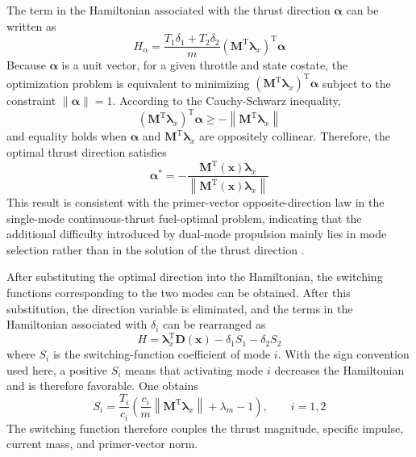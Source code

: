 ﻿\documentclass{IEEEtaes}
\begin{document}
The term in the Hamiltonian associated with the thrust direction $\bm{\alpha}$ can be written as
\begin{equation}
H_{\alpha}=\frac{T_1\delta_1+T_2\delta_2}{m}\left(\bm{M}^{\mathrm{T}}\bm{\lambda}_x\right)^{\mathrm{T}}\bm{\alpha}
\end{equation}
Because $\bm{\alpha}$ is a unit vector, for a given throttle and state costate, the optimization problem is equivalent to minimizing $\left(\bm{M}^{\mathrm{T}}\bm{\lambda}_x\right)^{\mathrm{T}}\bm{\alpha}$ subject to the constraint $\|\bm{\alpha}\|=1$. According to the Cauchy-Schwarz inequality,
\begin{equation}
\left(\bm{M}^{\mathrm{T}}\bm{\lambda}_x\right)^{\mathrm{T}}\bm{\alpha}\geq-\left\|\bm{M}^{\mathrm{T}}\bm{\lambda}_x\right\|
\end{equation}
and equality holds when $\bm{\alpha}$ and $\bm{M}^{\mathrm{T}}\bm{\lambda}_x$ are oppositely collinear. Therefore, the optimal thrust direction satisfies
\begin{equation}
\bm{\alpha}^{*}=-\frac{\bm{M}^{\mathrm{T}}(\bm{x})\bm{\lambda}_x}{\left\|\bm{M}^{\mathrm{T}}(\bm{x})\bm{\lambda}_x\right\|}
\end{equation}
This result is consistent with the primer-vector opposite-direction law in the single-mode continuous-thrust fuel-optimal problem, indicating that the additional difficulty introduced by dual-mode propulsion mainly lies in mode selection rather than in the solution of the thrust direction \cite{chi2022,taheri2020a,cline2024a}.

After substituting the optimal direction into the Hamiltonian, the switching functions corresponding to the two modes can be obtained. After this substitution, the direction variable is eliminated, and the terms in the Hamiltonian associated with $\delta_i$ can be rearranged as
\begin{equation}
H=\bm{\lambda}_x^{\mathrm{T}}\bm{D}(\bm{x})-\delta_1S_1-\delta_2S_2
\end{equation}
where $S_i$ is the switching-function coefficient of mode $i$. With the sign convention used here, a positive $S_i$ means that activating mode $i$ decreases the Hamiltonian and is therefore favorable. One obtains
\begin{equation}
S_i=\frac{T_i}{c_i}\left(\frac{c_i}{m}\left\|\bm{M}^{\mathrm{T}}\bm{\lambda}_x\right\|+\lambda_m-1\right),\qquad i=1,2
\end{equation}
The switching function therefore couples the thrust magnitude, specific impulse, current mass, and primer-vector norm.
\end{document}
